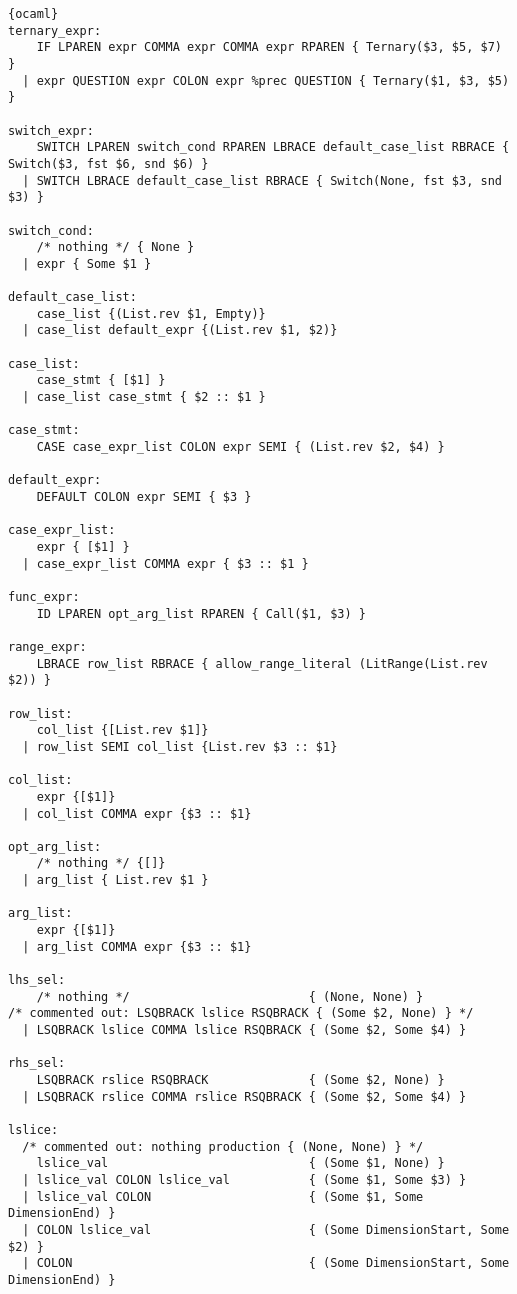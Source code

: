 \begin{lstlisting}{ocaml}
ternary_expr:
    IF LPAREN expr COMMA expr COMMA expr RPAREN { Ternary($3, $5, $7) }
  | expr QUESTION expr COLON expr %prec QUESTION { Ternary($1, $3, $5) }

switch_expr:
    SWITCH LPAREN switch_cond RPAREN LBRACE default_case_list RBRACE { Switch($3, fst $6, snd $6) }
  | SWITCH LBRACE default_case_list RBRACE { Switch(None, fst $3, snd $3) }

switch_cond:
    /* nothing */ { None }
  | expr { Some $1 }

default_case_list:
    case_list {(List.rev $1, Empty)}
  | case_list default_expr {(List.rev $1, $2)}

case_list:
    case_stmt { [$1] }
  | case_list case_stmt { $2 :: $1 }

case_stmt:
    CASE case_expr_list COLON expr SEMI { (List.rev $2, $4) }

default_expr:
    DEFAULT COLON expr SEMI { $3 }

case_expr_list:
    expr { [$1] }
  | case_expr_list COMMA expr { $3 :: $1 }

func_expr:
    ID LPAREN opt_arg_list RPAREN { Call($1, $3) }

range_expr:
    LBRACE row_list RBRACE { allow_range_literal (LitRange(List.rev $2)) }

row_list:
    col_list {[List.rev $1]}
  | row_list SEMI col_list {List.rev $3 :: $1}

col_list:
    expr {[$1]}
  | col_list COMMA expr {$3 :: $1}

opt_arg_list:
    /* nothing */ {[]}
  | arg_list { List.rev $1 }

arg_list:
    expr {[$1]}
  | arg_list COMMA expr {$3 :: $1}

lhs_sel:
    /* nothing */                         { (None, None) }
/* commented out: LSQBRACK lslice RSQBRACK { (Some $2, None) } */
  | LSQBRACK lslice COMMA lslice RSQBRACK { (Some $2, Some $4) }

rhs_sel:
    LSQBRACK rslice RSQBRACK              { (Some $2, None) }
  | LSQBRACK rslice COMMA rslice RSQBRACK { (Some $2, Some $4) }

lslice:
  /* commented out: nothing production { (None, None) } */
    lslice_val                            { (Some $1, None) }
  | lslice_val COLON lslice_val           { (Some $1, Some $3) }
  | lslice_val COLON                      { (Some $1, Some DimensionEnd) }
  | COLON lslice_val                      { (Some DimensionStart, Some $2) }
  | COLON                                 { (Some DimensionStart, Some DimensionEnd) }


\end{lstlisting}
